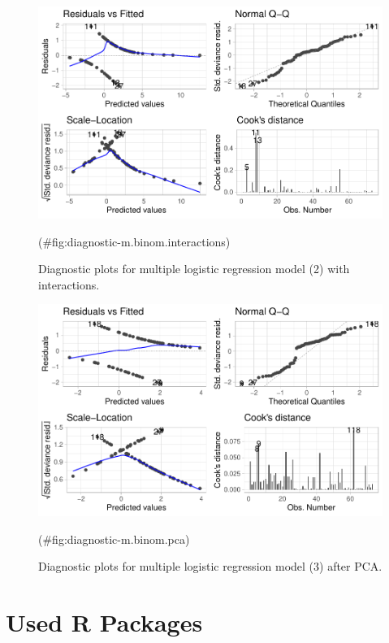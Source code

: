 \documentclass[
  english,
  doc,floatsintext]{apa6}
\begin{document}
\begin{figure}

{\centering \includegraphics{dap_report_anja_probst_files/figure-latex/diagnostic-m.binom.interactions-1} 

}

\caption{Diagnostic plots for multiple logistic regression model (2) with interactions.}(\#fig:diagnostic-m.binom.interactions)
\end{figure}

\begin{figure}

{\centering \includegraphics{dap_report_anja_probst_files/figure-latex/diagnostic-m.binom.pca-1} 

}

\caption{Diagnostic plots for multiple logistic regression model (3) after PCA.}(\#fig:diagnostic-m.binom.pca)
\end{figure}
\clearpage

\hypertarget{used-r-packages}{%
\section{Used R Packages}\label{used-r-packages}}
\end{document}
